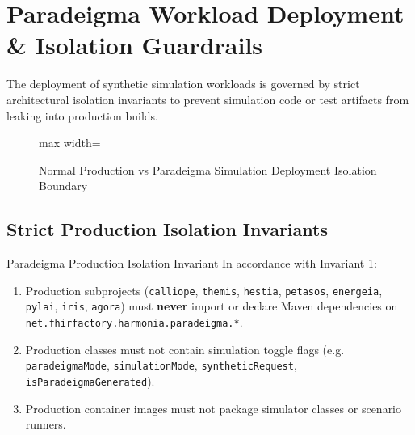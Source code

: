 
\chapter{Paradeigma Workload Deployment \& Isolation Guardrails}
\label{chap:paradeigma_deployment}

The deployment of synthetic simulation workloads is governed by strict architectural isolation invariants to prevent simulation code or test artifacts from leaking into production builds.

\begin{figure}[htbp]
    \centering
    \begin{adjustbox}{max width=\textwidth}
        
    \end{adjustbox}
    \caption{Normal Production vs Paradeigma Simulation Deployment Isolation Boundary}
    \label{fig:normal_vs_paradeigma}
\end{figure}

\section{Strict Production Isolation Invariants}

\begin{principlebox}{Paradeigma Production Isolation Invariant}
In accordance with Invariant 1:
\begin{enumerate}
    \item Production subprojects (\texttt{calliope}, \texttt{themis}, \texttt{hestia}, \texttt{petasos}, \texttt{energeia}, \texttt{pylai}, \texttt{iris}, \texttt{agora}) must \textbf{never} import or declare Maven dependencies on \texttt{net.fhirfactory.harmonia.paradeigma.*}.
    \item Production classes must not contain simulation toggle flags (e.g. \texttt{paradeigmaMode}, \texttt{simulationMode}, \texttt{syntheticRequest}, \texttt{isParadeigmaGenerated}).
    \item Production container images must not package simulator classes or scenario runners.
\end{enumerate}
\end{principlebox}

